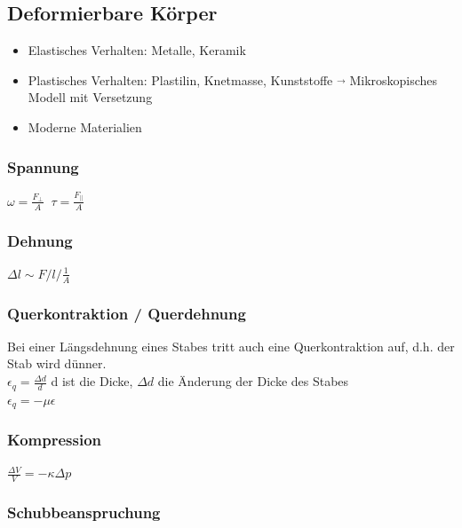 \subsection{Deformierbare Körper}

\begin{itemize}
	\item Elastisches Verhalten: Metalle, Keramik 
	\item Plastisches  Verhalten: Plastilin, Knetmasse, Kunststoffe $\overrightarrow{}$ Mikroskopisches Modell mit Versetzung
	\item Moderne Materialien
\end{itemize}


\subsubsection{Spannung}
$\omega = \frac{F_{\perp}}{A} \; \; \tau = \frac{F_{||}}{A}$ \\

\subsubsection{Dehnung}
$ \Delta l \sim F / l / \frac{1}{A}$

\subsubsection{Querkontraktion / Querdehnung}
Bei einer Längsdehnung eines Stabes tritt auch eine Querkontraktion auf, d.h. der Stab wird dünner. \\
$ \epsilon_{q} = \frac{\Delta d}{d}$ d ist die Dicke, $\Delta d$ die Änderung der Dicke des Stabes \\
$\epsilon_{q} = -\mu \epsilon $


\subsubsection{Kompression}

$\frac{\Delta V}{V} = - \kappa \Delta p $

\subsubsection{Schubbeanspruchung}



